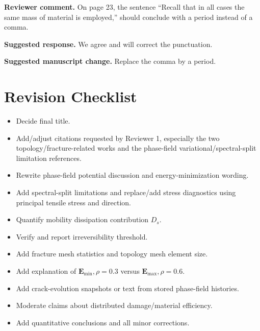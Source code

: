 \documentclass[11pt,a4paper]{article}
\newcommand{\Emin}{\ensuremath{\mathbf{E}_{\mathrm{min}}}}
\newcommand{\Emax}{\ensuremath{\mathbf{E}_{\mathrm{max}}}}
\newcommand{\comment}[1]{\par\noindent\textbf{Reviewer comment.} #1\par}
\newcommand{\response}[1]{\par\noindent\textbf{Suggested response.} #1\par}
\newcommand{\change}[1]{\par\noindent\textbf{Suggested manuscript change.} #1\par}
\begin{document}
\comment{On page 23, the sentence ``Recall that in all cases the same mass of
material is employed,'' should conclude with a period instead of a comma.}

\response{We agree and will correct the punctuation.}

\change{Replace the comma by a period.}

\section*{Revision Checklist}

\begin{itemize}
  \item Decide final title.
  \item Add/adjust citations requested by Reviewer 1, especially the two
  topology/fracture-related works and the phase-field variational/spectral-split
  limitation references.
  \item Rewrite phase-field potential discussion and energy-minimization
  wording.
  \item Add spectral-split limitations and replace/add stress diagnostics using
  principal tensile stress and direction.
  \item Quantify mobility dissipation contribution \(D_s\).
  \item Verify and report irreversibility threshold.
  \item Add fracture mesh statistics and topology mesh element size.
  \item Add explanation of \(\Emin,\rho=0.3\) versus \(\Emax,\rho=0.6\).
  \item Add crack-evolution snapshots or text from stored phase-field histories.
  \item Moderate claims about distributed damage/material efficiency.
  \item Add quantitative conclusions and all minor corrections.
\end{itemize}
\end{document}
